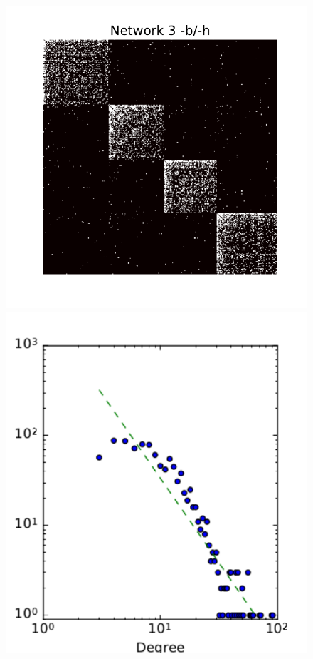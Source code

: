 \begin{figure}[h]

	\includegraphics[scale=0.32]{img/g3}
	\endminipage
	\includegraphics[scale=0.32]{img/g3_d}

\end{figure}
